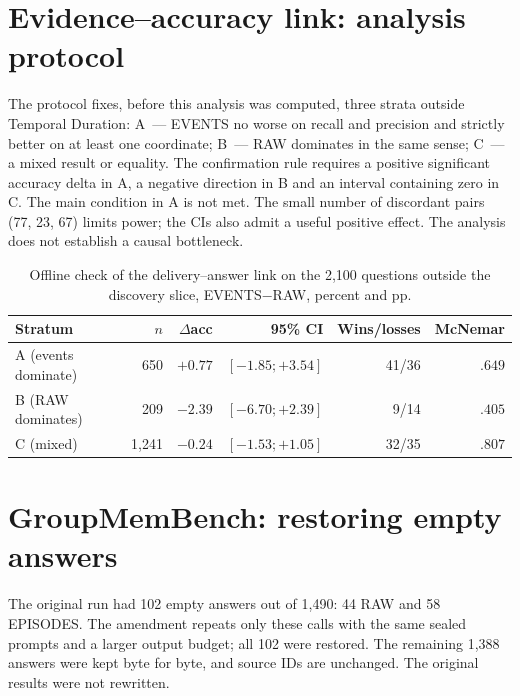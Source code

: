 \documentclass[11pt,a4paper]{article}
\newcommand{\raw}{RAW}
\newcommand{\events}{EVENTS}
\begin{document}
\section{Evidence--accuracy link: analysis protocol}
\label{app:frontier}

The protocol  fixes, before this
analysis was computed, three strata outside Temporal Duration: A~--- EVENTS no worse on
recall and precision and strictly better on at least one coordinate; B~--- RAW dominates
in the same sense; C~--- a mixed result or equality. The confirmation rule requires a
positive significant accuracy delta in A, a negative direction in B and an interval
containing zero in C. The main condition in A is not met. The small number of
discordant pairs (77, 23, 67) limits power; the CIs also admit a useful positive effect.
The analysis does not establish a causal bottleneck.

\begin{table}[ht]
\centering\small
\begin{tabular}{lrrrrr}
\toprule
Stratum & $n$ & $\Delta$acc & 95\% CI & Wins/losses & McNemar\\
\midrule
A (events dominate) & 650 & $+0.77$ & $[-1.85;+3.54]$ & 41/36 & $.649$\\
B (\raw{} dominates) & 209 & $-2.39$ & $[-6.70;+2.39]$ & 9/14 & $.405$\\
C (mixed) & 1,241 & $-0.24$ & $[-1.53;+1.05]$ & 32/35 & $.807$\\
\bottomrule
\end{tabular}
\caption{Offline check of the delivery--answer link on the 2,100 questions outside the
discovery slice, \events{}$-$\raw{}, percent and pp.}
\label{tab:frontier}
\end{table}

\section{GroupMemBench: restoring empty answers}
\label{app:repair}

The original run had 102 empty answers out of 1,490: 44 RAW and 58 EPISODES. The
amendment repeats only these calls with the same sealed prompts and a larger output
budget; all 102 were restored. The remaining 1,388 answers were kept byte for byte, and
source IDs are unchanged. The original results were not rewritten.
\end{document}
